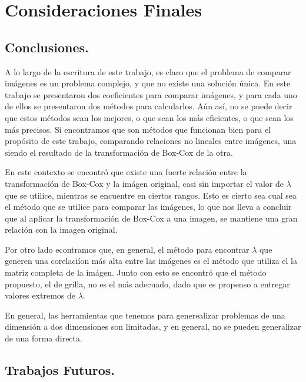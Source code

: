 \chapter{Consideraciones Finales}\label{chap6}

\section{Conclusiones.}


    A lo largo de la escritura de este trabajo, es claro que el problema de comparar im\'agenes es un problema complejo, y que no existe una soluci\'on \'unica. En este trabajo se presentaron dos coeficientes para comparar im\'agenes, y para cada uno de ellos se presentaron dos m\'etodos para calcularlos. A\'un as\'i, no se puede decir que estos m\'etodos sean los mejores, o que sean los m\'as eficientes, o que sean los m\'as precisos. Si encontramos que son m\'etodos que funcionan bien para el prop\'osito de este trabajo, comparando relaciones no lineales entre im\'agenes, una siendo el resultado de la transformaci\'on de Box-Cox de la otra.

    En este contexto se encontr\'o que existe una fuerte relaci\'on entre la transformaci\'on de Box-Cox y la im\'agen original, casi sin importar el valor de $\lambda$ que se utilice, mientras se encuentre en ciertos rangos. Esto es cierto sea cual sea el m\'etodo que se utilice para comparar las im\'agenes, lo que nos lleva a concluir que al aplicar la transformaci\'on de Box-Cox a una imagen, se mantiene una gran relaci\'on con la imagen original.

    Por otro lado econtramos que, en general, el m\'etodo para encontrar $\lambda$ que generen una corelaci\'ion m\'as alta entre las im\'agenes es el m\'etodo que utiliza el la matriz completa de la im\'agen. Junto con esto se encontr\'o que el m\'etodo propuesto, el de grilla, no es el m\'as adecuado, dado que es propenso a entregar valores extremos de $\lambda$. 

    En general, las herramientas que tenemos para generealizar problemas de una dimensi\'on a dos dimensiones son limitadas, y en general, no se pueden generalizar de una forma directa.
    


\section{Trabajos Futuros.}

